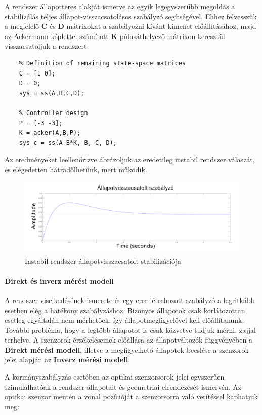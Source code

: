 A rendszer állapotteres alakját ismerve az egyik legegyszerűbb megoldás a stabilizálás teljes állapot-visszacsatolásos szabályzó segítségével. Ehhez felvesszük a megfelelő \textbf{C} és \textbf{D} mátrixokat a szabályozni kívánt kimenet előállításához, majd az Ackermann-képlettel számított \textbf{K} pólusáthelyező mátrixon keresztül visszacsatoljuk a rendszert.

\begin{lstlisting}
    % Definition of remaining state-space matrices
    C = [1 0];
    D = 0;
    sys = ss(A,B,C,D);
    
    % Controller design
    P = [-3 -3];
    K = acker(A,B,P);
    sys_c = ss(A-B*K, B, C, D);
\end{lstlisting}

Az eredményeket leellenőrizve ábrázoljuk az eredetileg instabil rendszer válaszát, és elégedetten hátradőlhetünk, mert működik.

\begin{figure}[!ht]
    \centering
    \includegraphics[width=\linewidth]{img/plot2}
    \caption{Instabil rendszer állapotvisszacsatolt stabilizációja}
    \label{fig:plot2}
\end{figure}

\paragraph{Direkt és inverz mérési modell}

A rendszer viselkedésének ismerete és egy erre létrehozott szabályzó a legritkább esetben elég a hatékony szabályzáshoz. Bizonyos állapotok csak korlátozottan, esetleg egyáltalán nem mérhetőek, így állapotmegfigyelővel kell előállítanunk. További probléma, hogy a legtöbb állapotot is csak közvetve tudjuk mérni, zajjal terhelve.
A szenzorok érzékeléseinek előállása az állapotváltozók függvényében a \textbf{Direkt mérési modell}, illetve a megfigyelhető állapotok becslése a szenzorok jelei alapján az \textbf{Inverz mérési modell}.

A kormányszabályzás esetében az optikai szenzorsorok jelei egyszerűen szimulálhatóak a rendszer állapotait és geometriai elrendezését ismervén. Az optikai szenzor mentén a vonal pozícióját a szenzorsorra való vetítéssel kaphatjuk meg:

